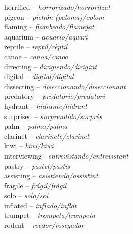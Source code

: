 \documentclass[output=paper,modfonts,nonflat,newtxmath]{langsci/langscibook}
\begin{document}
\begin{multicols}{2}
horrified  – \textit{horrorizado/horroritzat} \\
pigeon  – \textit{pichón} \textit{(paloma)/colom} \\
flaming  – \textit{flambeado/flamejat}\\
aquarium  – \textit{acuario/aquari} \\
reptile  – \textit{reptil/rèptil}\\
canoe  – \textit{canoa/canoa} \\
directing  – \textit{dirigiendo/dirigint} \\
digital  – \textit{digital/digital} \\
dissecting  – \textit{diseccionando/diseccionant}\\
predatory  – \textit{predatorio/predatori} \\
hydrant  – \textit{hidrante/hidrant} \\
surprised  – \textit{sorprendido/sorprès}\\
palm   – \textit{palma/palma} \\
clarinet  – \textit{clarinete/clarinet} \\
kiwi  – \textit{kiwi/kiwi} \\
interviewing\,–\,\textit{entrevistando/entrevistant} \\
pastry – \textit{pastel/pastís}\\
assisting  – \textit{asistiendo/assistint}  \\
fragile  – \textit{frágil/fràgil} \\
solo  – \textit{solo/sol} \\
inflated  – \textit{inflado/inflat} \\
trumpet  – \textit{trompeta/trompeta} \\
rodent  – \textit{roedor/rosegador}
\end{multicols}

{\sloppy\printbibliography[heading=subbibliography,notkeyword=this]}
\end{document}
